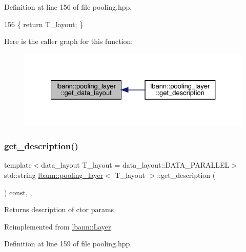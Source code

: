 Definition at line 156 of file pooling.\+hpp.


\begin{DoxyCode}
156 \{ \textcolor{keywordflow}{return} T\_layout; \}
\end{DoxyCode}
Here is the caller graph for this function\+:\nopagebreak
\begin{figure}[H]
\begin{center}
\leavevmode
\includegraphics[width=327pt]{classlbann_1_1pooling__layer_ad6d7e7476521ed4a4c43db493807b2ca_icgraph}
\end{center}
\end{figure}
\mbox{\label{classlbann_1_1pooling__layer_a11f6d5c7ef16a62d081164f174825ab2}} 
\subsubsection{\texorpdfstring{get\+\_\+description()}{get\_description()}}
{\footnotesize\ttfamily template$<$data\+\_\+layout T\+\_\+layout = data\+\_\+layout\+::\+D\+A\+T\+A\+\_\+\+P\+A\+R\+A\+L\+L\+EL$>$ \\
std\+::string \hyperlink{classlbann_1_1pooling__layer}{lbann\+::pooling\+\_\+layer}$<$ T\+\_\+layout $>$\+::get\+\_\+description (\begin{DoxyParamCaption}{ }\end{DoxyParamCaption}) const\hspace{0.3cm}{\ttfamily [inline]}, {\ttfamily [override]}, {\ttfamily [virtual]}}

Returns description of ctor params 

Reimplemented from \hyperlink{classlbann_1_1Layer_acc0803d3428914ca1eb5988c4309174a}{lbann\+::\+Layer}.



Definition at line 159 of file pooling.\+hpp.


